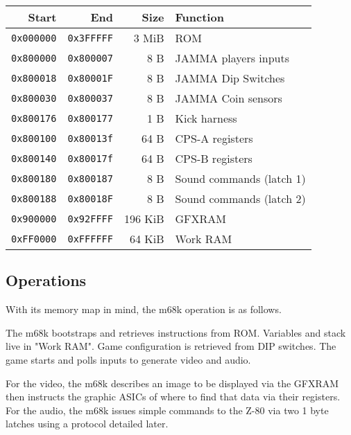 \begin{tabularx}{\textwidth}{rrrX}
  \textbf{Start } & \textbf{End  } & \textbf{Size } & \textbf{Function } \\               
  \toprule    
  \texttt{0x000000} & \texttt{0x3FFFFF} & 3 MiB & ROM \\
  \toprule    
  \texttt{0x800000} & \texttt{0x800007} & 8 B & JAMMA players inputs \\
  \texttt{0x800018} & \texttt{0x80001F} & 8 B & JAMMA Dip Switches \\
  \texttt{0x800030} & \texttt{0x800037} & 8 B & JAMMA Coin sensors \\
  \texttt{0x800176} & \texttt{0x800177} & 1 B & Kick harness \\
\toprule    
  \texttt{0x800100} & \texttt{0x80013f} & 64 B & CPS-A registers\\
  \texttt{0x800140} & \texttt{0x80017f} & 64 B & CPS-B registers\\
\toprule    
  \texttt{0x800180} & \texttt{0x800187} & 8 B & Sound commands (latch 1)\\
  \texttt{0x800188} & \texttt{0x80018F} & 8 B & Sound commands (latch 2)\\
  \toprule    
  \texttt{0x900000} & \texttt{0x92FFFF} & 196 KiB & GFXRAM\\
  \texttt{0xFF0000} & \texttt{0xFFFFFF} & 64 KiB & Work RAM \\
\end{tabularx}%

\subsection{Operations}
With its memory map in mind, the m68k operation is as follows.

The m68k bootstraps and retrieves instructions from ROM. Variables and stack live in "Work RAM". Game configuration is retrieved from DIP switches. The game starts and polls inputs to generate video and audio. 

For the video, the m68k describes an image to be displayed via the GFXRAM then instructs the graphic ASICs of where to find that data via their registers. For the audio, the m68k issues simple commands to the Z-80 via two 1 byte latches using a protocol detailed later.
  











